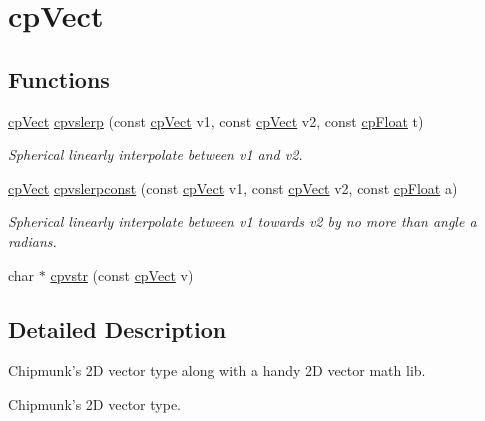 \hypertarget{group__cp_vect}{\section{cp\-Vect}
\label{group__cp_vect}
}
\subsection*{Functions}
\begin{DoxyCompactItemize}
\item 
\hypertarget{group__cp_vect_gad894c8a975c4afb57f1ca45907417754}{\hyperlink{structcp_vect}{cp\-Vect} \hyperlink{group__cp_vect_gad894c8a975c4afb57f1ca45907417754}{cpvslerp} (const \hyperlink{structcp_vect}{cp\-Vect} v1, const \hyperlink{structcp_vect}{cp\-Vect} v2, const \hyperlink{group__basic_types_gac1ed65573e035bf892505768c852d8d3}{cp\-Float} t)}\label{group__cp_vect_gad894c8a975c4afb57f1ca45907417754}

\begin{DoxyCompactList}\small\item\em Spherical linearly interpolate between v1 and v2. \end{DoxyCompactList}\item 
\hypertarget{group__cp_vect_ga03d3b2cc67829761ed03a33d203000d9}{\hyperlink{structcp_vect}{cp\-Vect} \hyperlink{group__cp_vect_ga03d3b2cc67829761ed03a33d203000d9}{cpvslerpconst} (const \hyperlink{structcp_vect}{cp\-Vect} v1, const \hyperlink{structcp_vect}{cp\-Vect} v2, const \hyperlink{group__basic_types_gac1ed65573e035bf892505768c852d8d3}{cp\-Float} a)}\label{group__cp_vect_ga03d3b2cc67829761ed03a33d203000d9}

\begin{DoxyCompactList}\small\item\em Spherical linearly interpolate between v1 towards v2 by no more than angle a radians. \end{DoxyCompactList}\item 
char $\ast$ \hyperlink{group__cp_vect_ga37480a0e70b8ae9e1ea74e6483555305}{cpvstr} (const \hyperlink{structcp_vect}{cp\-Vect} v)
\end{DoxyCompactItemize}


\subsection{Detailed Description}
Chipmunk's 2\-D vector type along with a handy 2\-D vector math lib.

Chipmunk's 2\-D vector type. 

